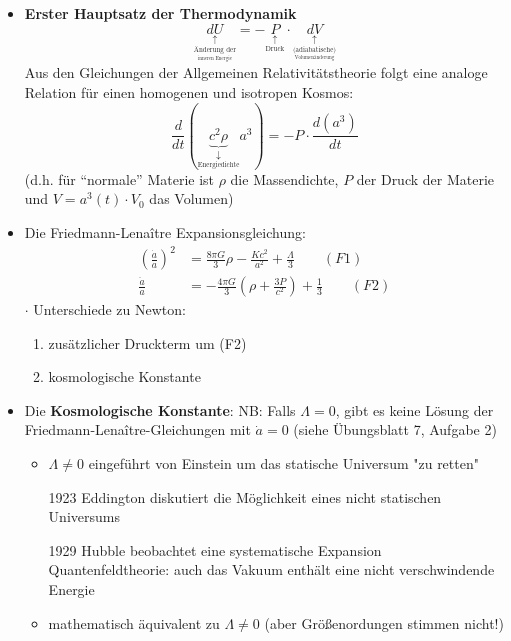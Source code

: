 \begin{itemize}
	\item \textbf{Erster Hauptsatz der Thermodynamik}\\
		\begin{equation*}
			\underset{\underset{\underset{\text{inneren Energie}}{\text{Änderung der}}}{\uparrow}}{dU}=-\underset{\underset{\text{Druck}}{\uparrow}}{P}\cdot\underset{\underset{\underset{\text{Volumenänderung}}{\text{(adiabatische)}}}{\uparrow}}{dV}
		\end{equation*}
		Aus den Gleichungen der Allgemeinen Relativitätstheorie folgt eine analoge Relation für einen homogenen und isotropen Kosmos:
		\begin{equation*}
			\frac{d}{dt}(\underset{\underset{\text{Energiedichte}}{\downarrow}}{\underbrace{c^2\rho}}a^3)=-P\cdot\frac{d(a^3)}{dt}
		\end{equation*}
		(d.h. für "`normale"' Materie ist $\rho$ die Massendichte, $P$ der Druck der Materie und $V=a^3(t)\cdot V_0$ das Volumen)
	\item Die Friedmann-Lena\^itre Expansionsgleichung:
		\begin{align*}
			\left(\frac{\dot{a}}{a}\right)^2&=\frac{8\pi G}{3}\rho -\frac{Kc^2}{a^2}+\frac{\Lambda}{3} \qquad (F1)\\
			\frac{\ddot{a}}{a}&=-\frac{4\pi G}{3}\left(\rho+\frac{3P}{c^2}\right)+\frac{1}{3} \qquad (F2)
		\end{align*}
		$\cdot$  Unterschiede zu Newton:
		\begin{enumerate}[label={$(\roman*)$}]
			\item zusätzlicher Druckterm um (F2)
			\item kosmologische Konstante
		\end{enumerate}
	\item Die \textbf{Kosmologische Konstante}:
		NB: Falls $\Lambda =0$, gibt es keine Lösung der Friedmann-Lena\^itre-Gleichungen mit $\dot{a}=0$ (siehe Übungsblatt 7, Aufgabe 2)
		\begin{itemize}
			\item $\Lambda\neq 0$ eingeführt von Einstein um das statische Universum "zu retten"
			\item[1923] Eddington diskutiert die Möglichkeit eines nicht statischen Universums
			\item[1929] Hubble beobachtet eine systematische Expansion\\
				Quantenfeldtheorie: auch das Vakuum enthält eine nicht verschwindende Energie
			\item mathematisch äquivalent zu $\Lambda\neq 0$ (aber Größenordungen stimmen nicht!)
		\end{itemize}
\end{itemize}
